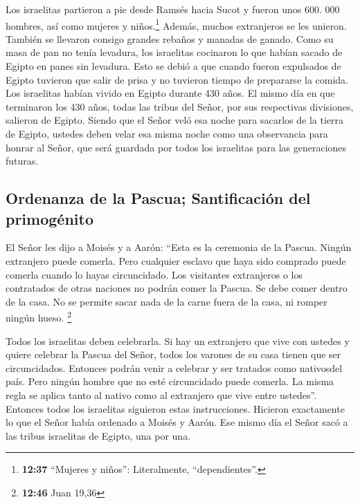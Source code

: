  Los israelitas partieron a pie desde Ramsés hacia Sucot
y fueron unos 600. 000 hombres, así como mujeres y niños.\footnote{\textbf{12:37}
  ``Mujeres y niños'': Literalmente, ``dependientes''.} 
Además, muchos extranjeros se les unieron. También se llevaron consigo
grandes rebaños y manadas de ganado.  Como su masa de pan
no tenía levadura, los israelitas cocinaron lo que habían sacado de
Egipto en panes sin levadura. Esto se debió a que cuando fueron
expulsados de Egipto tuvieron que salir de prisa y no tuvieron tiempo de
prepararse la comida.  Los israelitas habían vivido en
Egipto durante 430 años.  El mismo día en que terminaron
los 430 años, todas las tribus del Señor, por sus respectivas
divisiones, salieron de Egipto.  Siendo que el Señor veló
esa noche para sacarlos de la tierra de Egipto, ustedes deben velar esa
misma noche como una observancia para honrar al Señor, que será guardada
por todos los israelitas para las generaciones futuras.

\hypertarget{ordenanza-de-la-pascua-santificaciuxf3n-del-primoguxe9nito}{%
\subsection{Ordenanza de la Pascua; Santificación del
primogénito}\label{ordenanza-de-la-pascua-santificaciuxf3n-del-primoguxe9nito}}

 El Señor les dijo a Moisés y a Aarón: ``Esta es la
ceremonia de la Pascua. Ningún extranjero puede comerla. 
Pero cualquier esclavo que haya sido comprado puede comerla cuando lo
hayas circuncidado.  Los visitantes extranjeros o los
contratados de otras naciones no podrán comer la Pascua. 
Se debe comer dentro de la casa. No se permite sacar nada de la carne
fuera de la casa, ni romper ningún hueso. \footnote{\textbf{12:46} Juan
  19,36}

 Todos los israelitas deben celebrarla. 
Si hay un extranjero que vive con ustedes y quiere celebrar la Pascua
del Señor, todos los varones de su casa tienen que ser circuncidados.
Entonces podrán venir a celebrar y ser tratados como nativosdel país.
Pero ningún hombre que no esté circuncidado puede comerla.
 La misma regla se aplica tanto al nativo como al
extranjero que vive entre ustedes''.  Entonces todos los
israelitas siguieron estas instrucciones. Hicieron exactamente lo que el
Señor había ordenado a Moisés y Aarón.  Ese mismo día el
Señor sacó a las tribus israelitas de Egipto, una por una.

